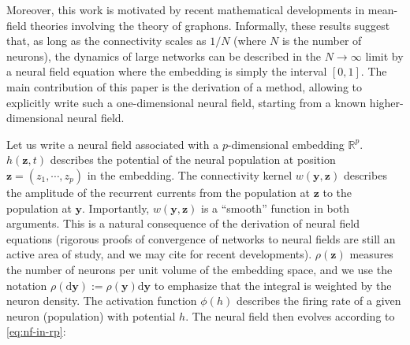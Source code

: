 \documentclass[NETN,manuscript]{stjour-new}
\def\R{\mathbb R}
\def\Rp{\R^p}
\renewcommand{\vec}[1]{\boldsymbol{#1}}
\begin{document}
Moreover, this work is motivated by recent mathematical developments \citep{JabPoy21} in mean-field theories involving the theory of graphons. Informally, these results suggest that, as long as the connectivity scales as $1/N$ (where $N$ is the number of neurons), the dynamics of large networks can be described in the $N \to \infty$ limit by a neural field equation where the embedding is simply the interval $[0,1]$. The main contribution of this paper is the derivation of a method, allowing to explicitly write such a one-dimensional neural field, starting from a known higher-dimensional neural field.





Let us write a neural field associated with a $p$-dimensional embedding $\Rp$. $h(\vec z, t)$ describes the potential of the neural population at position $\vec z=(z_1,\cdots,z_p)$ in the embedding. The connectivity kernel $w(\vec y, \vec z)$ describes the amplitude of the recurrent currents from the population at $\vec z$ to the population at $\vec y$. Importantly, $w(\vec y, \vec z)$ is a ``smooth'' function in both arguments. This is a natural consequence of the derivation of neural field equations (rigorous proofs of convergence of networks to neural fields are still an active area of study, and we may cite \citep{CheDua19,AGATHENERINE202286} for recent developments).
$\rho(\vec z)$ measures the number of neurons per unit volume of the embedding space, and we use the notation $\rho(\mathrm d \vec y) := \rho(\vec y) \mathrm d \vec y$ to emphasize that the integral is weighted by the neuron density. The activation function $\phi(h)$ describes the firing rate of a given neuron (population) with potential $h$. The neural field then evolves according to \autoref{eq:nf-in-rp}:  
\end{document}
